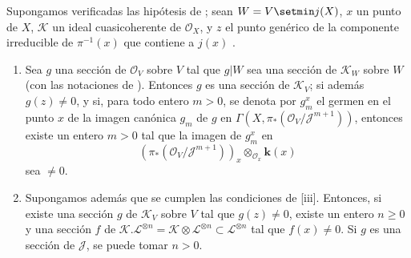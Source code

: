 \documentclass[oneside,10pt]{amsart}
\let\EGAOriginalLabel\label
\renewcommand{\label}[1]{\phantomsection\EGAOriginalLabel{#1}}
\begin{document}
\begin{corollary}[8.10.5]
\label{II.8.10.5-fr}
Supongamos verificadas las hipótesis de ;
sean $W=V\setmin j(X)$, $x$ un punto de $X$, $\mathcal{K}$ un ideal cuasicoherente de $\mathcal{O}_X$, y $z$ el punto genérico de la componente irreducible de $\pi^{-1}(x)$ que contiene a $j(x)$ .
\begin{enumerate}
    \item[\rm{(i)}] Sea $g$ una sección de $\mathcal{O}_V$ sobre $V$ tal que $g|W$ sea una sección de $\mathcal{K}_W$ sobre $W$ (con las notaciones de ).
        Entonces $g$ es una sección de $\mathcal{K}_V$;
        si además $g(z)\neq0$, y si, para todo entero $m>0$, se denota por $g_m^x$ el germen en el punto $x$ de la imagen canónica $g_m$ de $g$ en $\Gamma(X,\pi_*(\mathcal{O}_V/\mathcal{J}^{m+1}))$, entonces existe un entero $m>0$ tal que la imagen de $g_m^x$ en
        \[
    (\pi_*(\mathcal{O}_V/\mathcal{J}^{m+1}))_x
    \otimes_{\mathcal{O}_x}\boldsymbol{k}(x)
  \]
        sea $\neq0$.
    \item[\rm{(ii)}] Supongamos además que se cumplen las condiciones de [iii].
        Entonces, si existe una sección $g$ de $\mathcal{K}_V$ sobre $V$ tal que $g(z)\neq0$, existe un entero $n\geqslant0$ y una sección $f$ de $\mathcal{K}.\mathcal{L}^{\otimes n}=
  \mathcal{K}\otimes\mathcal{L}^{\otimes n}\subset\mathcal{L}^{\otimes n}$ tal que $f(x)\neq0$.
        Si $g$ es una sección de $\mathcal{J}$, se puede tomar $n>0$.
\end{enumerate}
\end{corollary}
\end{document}
